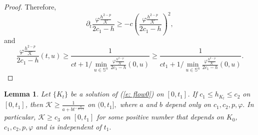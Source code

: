 \documentclass{amsart}
\newtheorem{lemma}[theorem]{Lemma}
\theoremstyle{definition}
\theoremstyle{remark}
\numberwithin{equation}{section}
\begin{document}
\begin{proof}
Therefore,
\[\partial_t\frac{\varphi\frac{h^{2-p}}{\mathcal{K}}}{2c_1-h}\geq -c\left(\frac{\varphi\frac{h^{2-p}}{\mathcal{K}}}{2c_1-h}\right)^2,\]
and \[\frac{\varphi\frac{h^{2-p}}{\mathcal{K}}}{2c_1-h}(t, u)\geq \frac{1}{ct+1/\min\limits_{u\in\mathbb{S}^{n}}\frac{\varphi\frac{h^{2-p}}{\mathcal{K}}}{2c_1-h}(0, u)}\geq \frac{1}{ct_1+1/\min\limits_{u\in\mathbb{S}^{n}}\frac{\varphi\frac{h^{2-p}}{\mathcal{K}}}{2c_1-h}(0, u)}.\]
\end{proof}
\begin{lemma}\label{lem: upper}
Let $\{K_t\}$ be a solution of (\ref{e: flow0}) on $[0,t_1]$. If $c_1\leq h_{K_t}\leq c_2$ on $[0,t_1]$, then $\mathcal{K}\geq \frac{1}{a+b t^{-\frac{n}{n+1}}}$ on $(0,t_1],$ where $a$ and $b$ depend only on $c_1,c_2,p,\varphi.$ In particular, $\mathcal{K}\ge c_3$ on $[0,t_1]$ for some positive  number that depends on $K_0$, $c_1,c_2,p,\varphi$ and is independent of $t_1.$
\end{lemma}
\end{document}
